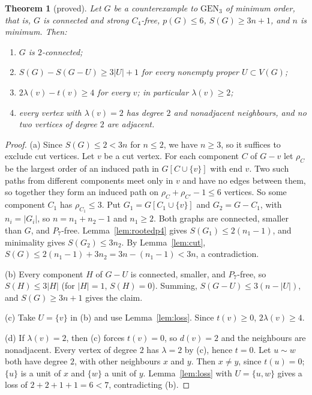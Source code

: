 \documentclass[11pt]{amsart}
\newtheorem{theorem}{Theorem}[section]
\theoremstyle{definition}
\theoremstyle{remark}
\newcommand{\pp}{p}
\begin{document}
\begin{theorem}[proved]\label{thm:red}
Let $G$ be a counterexample to $\mathrm{GEN}_3$ of minimum order, that is, $G$ is connected and strong $C_4$-free, $\pp(G)\le6$, $S(G)\ge3n+1$, and $n$ is minimum. Then:
\begin{enumerate}
\item[(a)] $G$ is $2$-connected;
\item[(b)] $S(G)-S(G-U)\ge3|U|+1$ for every nonempty proper $U\subset V(G)$;
\item[(c)] $2\lambda(v)-t(v)\ge4$ for every $v$; in particular $\lambda(v)\ge2$;
\item[(d)] every vertex with $\lambda(v)=2$ has degree $2$ and nonadjacent neighbours, and no two vertices of degree $2$ are adjacent.
\end{enumerate}
\end{theorem}

\begin{proof}
(a) Since $S(G)\le 2<3n$ for $n\le2$, we have $n\ge3$, so it suffices to exclude cut vertices. Let $v$ be a cut vertex. For each component $C$ of $G-v$ let $\rho_C$ be the largest order of an induced path in $G[C\cup\{v\}]$ with end $v$. Two such paths from different components meet only in $v$ and have no edges between them, so together they form an induced path on $\rho_C+\rho_{C'}-1\le6$ vertices. So some component $C_1$ has $\rho_{C_1}\le3$. Put $G_1=G[C_1\cup\{v\}]$ and $G_2=G-C_1$, with $n_i=|G_i|$, so $n=n_1+n_2-1$ and $n_1\ge2$. Both graphs are connected, smaller than $G$, and $P_7$-free. Lemma~\ref{lem:rootedp4} gives $S(G_1)\le2(n_1-1)$, and minimality gives $S(G_2)\le3n_2$. By Lemma~\ref{lem:cut}, $S(G)\le2(n_1-1)+3n_2=3n-(n_1-1)<3n$, a contradiction.

(b) Every component $H$ of $G-U$ is connected, smaller, and $P_7$-free, so $S(H)\le3|H|$ (for $|H|=1$, $S(H)=0$). Summing, $S(G-U)\le3(n-|U|)$, and $S(G)\ge3n+1$ gives the claim.

(c) Take $U=\{v\}$ in (b) and use Lemma~\ref{lem:loss}. Since $t(v)\ge0$, $2\lambda(v)\ge4$.

(d) If $\lambda(v)=2$, then (c) forces $t(v)=0$, so $d(v)=2$ and the neighbours are nonadjacent. Every vertex of degree $2$ has $\lambda=2$ by (c), hence $t=0$. Let $u\sim w$ both have degree $2$, with other neighbours $x$ and $y$. Then $x\ne y$, since $t(u)=0$; $\{u\}$ is a unit of $x$ and $\{w\}$ a unit of $y$. Lemma~\ref{lem:loss} with $U=\{u,w\}$ gives a loss of $2+2+1+1=6<7$, contradicting (b).
\end{proof}
\end{document}

